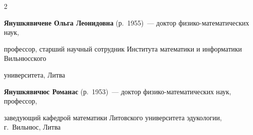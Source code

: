 \begin{multicols}{2}
\noindent

\textbf{Янушкявичене Ольга Леонидовна}  (р.\ 1955)~--- доктор фи\-зи\-ко-математических наук, 

профессор,  старший научный сотрудник Института математики и информатики Вильнюсского 

университета, Литва



\vspace*{5pt}



\noindent

\textbf{Янушкявичюс Романас}  (р.\ 1953)~---  доктор фи\-зи\-ко-ма\-те\-ма\-тических наук, профессор,

заведующий кафедрой математики Литовского университета эдукологии, г.\ Вильнюс, Литва





\def\leftfootline{\small{\textbf{\thepage}

\hfill ИНФОРМАТИКА И ЕЁ ПРИМЕНЕНИЯ\ \ \ том~6\ \ \ выпуск~3\ \ \ 2012}

}%

 \def\rightfootline{\small{ИНФОРМАТИКА И ЕЁ ПРИМЕНЕНИЯ\ \ \ том~6\ \ \ выпуск~3\ \ \ 2012

\hfill \textbf{\thepage}}}





\end{multicols}



\newpage

